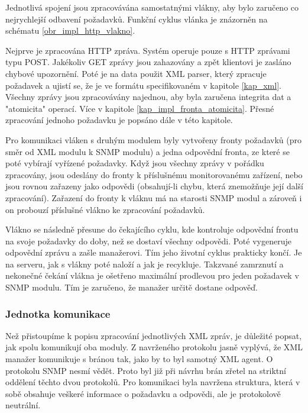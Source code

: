 Jednotlivá spojení jsou zpracovávána samostatnými vlákny, aby bylo zaručeno co nejrychlejší odbavení požadavků. Funkční cyklus vlánka je znázorněn
na schématu \ref{obr_impl_http_vlakno}. 

Nejprve je zpracována HTTP zpráva. Systém operuje pouze s HTTP zprávami typu POST. Jakékoliv GET zprávy jsou zahazovány a zpět klientovi je zasláno
chybové upozornění. Poté je na data použit XML parser, který zpracuje požadavek a ujistí se, že je ve formátu specifikovaném v kapitole \ref{kap_xml}.
Všechny zprávy jsou zpracovávány najednou, aby byla zaručena integrita dat a "atomicita" operací. Více v kapitole \ref{kap_impl_fronta_atomicita}. 
Přesné zpracování jednoho požadavku je popsáno dále v této kapitole.

Pro komunikaci vláken s druhým modulem byly vytvořeny fronty požadavků (pro směr od XML modulu k SNMP modulu)
a jedna odpovědní fronta, ze které se poté vybírají vyřízené požadavky.
Když jsou všechny zprávy v pořádku zpracovány, jsou odeslány do fronty k příslušnému monitorovanému zařízení, nebo jsou rovnou zařazeny
jako odpovědi (obsahují-li chybu, která znemožňuje její další zpracování). Zařazení do fronty k vláknu má na starosti SNMP modul a zároveň
i on probouzí příslušné vlákno ke zpracování požadavků.

Vlákno se následně přesune do čekajícího cyklu, kde kontroluje odpovědní frontu na svoje požadavky do doby, než se dostaví všechny odpovědi. 
Poté vygeneruje odpovědní zprávu a zašle manažerovi. Tím jeho životní cyklus prakticky končí. Je na serveru, jak s vlákny poté naloží a jak 
je recykluje. Takzvané zamrznutí a nekonečné čekání vlákna je ošetřeno maximální prodlevou pro jeden požadavek v SNMP modulu. Tím je zaručeno, že
manažer určitě dostane odpověď.

\subsubsection*{Jednotka komunikace}
Než přistoupíme k popisu zpracování jednotlivých XML zpráv, je důležité popsat, jak spolu komunikují oba moduly. Z navrženého protokolu jasně 
vyplývá, že XML manažer komunikuje s bránou tak, jako by to byl samotný XML agent. O protokolu SNMP nesmí vědět. Proto byl již při návrhu
brán zřetel na striktní oddělení těchto dvou protokolů. Pro komunikaci byla navržena struktura, která v sobě obsahuje veškeré informace o
požadavku a odpovědi, ale je protokolově neutrální.

